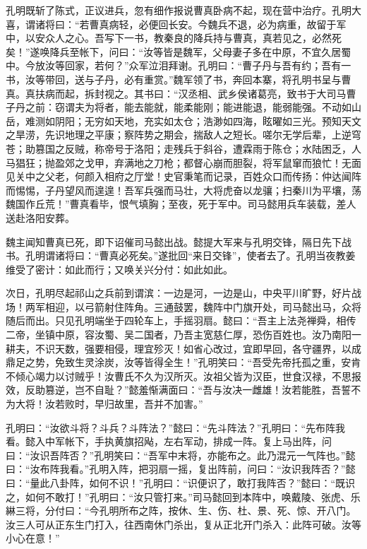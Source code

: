 孔明既斩了陈式，正议进兵，忽有细作报说曹真卧病不起，现在营中治疗。孔明大喜，谓诸将曰：“若曹真病轻，必便回长安。今魏兵不退，必为病重，故留于军中，以安众人之心。吾写下一书，教秦良的降兵持与曹真，真若见之，必然死矣！”遂唤降兵至帐下，问曰：“汝等皆是魏军，父母妻子多在中原，不宜久居蜀中。今放汝等回家，若何？”众军泣泪拜谢。孔明曰：“曹子丹与吾有约；吾有一书，汝等带回，送与子丹，必有重赏。”魏军领了书，奔回本寨，将孔明书呈与曹真。真扶病而起，拆封视之。其书曰：“汉丞相、武乡侯诸葛亮，致书于大司马曹子丹之前：窃谓夫为将者，能去能就，能柔能刚；能进能退，能弱能强。不动如山岳，难测如阴阳；无穷如天地，充实如太仓；浩渺如四海，眩曜如三光。预知天文之旱涝，先识地理之平康；察阵势之期会，揣敌人之短长。嗟尔无学后辈，上逆穹苍；助篡国之反贼，称帝号于洛阳；走残兵于斜谷，遭霖雨于陈仓；水陆困乏，人马猖狂；抛盈郊之戈甲，弃满地之刀枪；都督心崩而胆裂，将军鼠窜而狼忙！无面见关中之父老，何颜入相府之厅堂！史官秉笔而记录，百姓众口而传扬：仲达闻阵而惕惕，子丹望风而遑遑！吾军兵强而马壮，大将虎奋以龙骧；扫秦川为平壤，荡魏国作丘荒！”曹真看毕，恨气填胸；至夜，死于军中。司马懿用兵车装载，差人送赴洛阳安葬。

魏主闻知曹真已死，即下诏催司马懿出战。懿提大军来与孔明交锋，隔日先下战书。孔明谓诸将曰：“曹真必死矣。”遂批回“来日交锋”，使者去了。孔明当夜教姜维受了密计：如此而行；又唤关兴分付：如此如此。

次日，孔明尽起祁山之兵前到谓滨：一边是河，一边是山，中央平川旷野，好片战场！两军相迎，以弓箭射住阵角。三通鼓罢，魏阵中门旗开处，司马懿出马，众将随后而出。只见孔明端坐于四轮车上，手摇羽扇。懿曰：“吾主上法尧禅舜，相传二帝，坐镇中原，容汝蜀、吴二国者，乃吾主宽慈仁厚，恐伤百姓也。汝乃南阳一耕夫，不识天数，强要相侵，理宜殄灭！如省心改过，宜即早回，各守疆界，以成鼎足之势，免致生灵涂炭，汝等皆得全生！”孔明笑曰：“吾受先帝托孤之重，安肯不倾心竭力以讨贼乎！汝曹氏不久为汉所灭。汝祖父皆为汉臣，世食汉禄，不思报效，反助篡逆，岂不自耻？”懿羞惭满面曰：“吾与汝决一雌雄！汝若能胜，吾誓不为大将！汝若败时，早归故里，吾并不加害。”

孔明曰：“汝欲斗将？斗兵？斗阵法？”懿曰：“先斗阵法？”孔明曰：“先布阵我看。懿入中军帐下，手执黄旗招飐，左右军动，排成一阵。复上马出阵，问曰：“汝识吾阵否？”孔明笑曰：“吾军中末将，亦能布之。此乃混元一气阵也。”懿曰：“汝布阵我看。”孔明入阵，把羽扇一摇，复出阵前，问曰：“汝识我阵否？”懿曰：“量此八卦阵，如何不识！”孔明曰：“识便识了，敢打我阵否？”懿曰：“既识之，如何不敢打！”孔明曰：“汝只管打来。”司马懿回到本阵中，唤戴陵、张虎、乐綝三将，分付曰：“今孔明所布之阵，按休、生、伤、杜、景、死、惊、开八门。汝三人可从正东生门打入，往西南休门杀出，复从正北开门杀入：此阵可破。汝等小心在意！”

